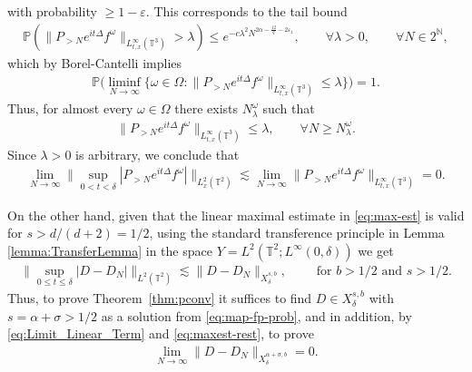 \documentclass[11pt, xcolor = dvipsnames,reqno
]{amsart}
\theoremstyle{definition}
\theoremstyle{remark}
\begin{document}
with probability $\geq 1 - \varepsilon$. 
This corresponds to the tail bound
\begin{align*}
    \mathbb{P}(\|P_{>N} e^{i t \Delta} f^{\omega}\|_{L^{\infty}_{t,x}(\mathbb{T}^3)}  > \lambda) \leq e^{-c \lambda^2 N^{2\alpha - \frac{12}{q} - 2\varepsilon_1}}, 
    \qquad \forall \lambda > 0, \qquad \forall N \in 2^{\mathbb N}, 
\end{align*}
which by Borel-Cantelli implies
\begin{align*}
        \mathbb{P} \Big(\liminf_{N \rightarrow \infty} \big\{ \omega \in \Omega : \|P_{> N} e^{it\Delta}f^{\omega}\|_{L^{\infty}_{t,x}(\mathbb{T}^3)} \leq \lambda \big\} \Big) = 1.
    \end{align*}
    Thus, for almost every $\omega \in \Omega$ there exists $N^{\omega}_{\lambda}$ such that
    \begin{align*}
        \|P_{> N} e^{it\Delta}f^{\omega}\|_{L^{\infty}_{t,x}(\mathbb{T}^3)} \leq \lambda, 
        \qquad \forall N \geq N^{\omega}_{\lambda}.
    \end{align*}
    Since $\lambda > 0$ is arbitrary, we conclude that  
    \begin{align}\label{eq:prob-tail}
        \lim_{N \to \infty} 
        \Big\| \sup_{0 < t < \delta} 
		| P_{> N} e^{it\Delta} f^\omega | \Big\|_{L^2_x(\mathbb{T}^2)} \lesssim 
        \lim_{N \to \infty} \|P_{> N} e^{it\Delta}f^{\omega}\|_{L^{\infty}_{t,x}(\mathbb{T}^3)} = 0. 
    \end{align}

    
    On the other hand, given that the linear maximal estimate in \eqref{eq:max-est} is valid for $s > d/(d+2) = 1/2$, using the standard transference principle in Lemma \ref{lemma:TransferLemma} in the space $Y = L^{2}(\mathbb{T}^2; L^{\infty}(0, \delta))$ we get
	\begin{align}\label{eq:maxest-rest}
		\Big\| \sup_{0 \leq t \leq \delta} | D - D_N | \Big\|_{L^2(\mathbb{T}^2)}  
        \lesssim
		\|  D  - D_N \|_{X^{s,b}_{\delta }},
        \qquad \text{ for } b > 1/2 \text{ and } s > 1/2.
	\end{align}
    Thus, to prove Theorem~\ref{thm:pconv} it suffices to find $D \in X^{s, b}_\delta$ with $s = \alpha + \sigma > 1/2$ as a solution from \eqref{eq:map-fp-prob}, 
    and in addition, by \eqref{eq:Limit_Linear_Term} and \eqref{eq:maxest-rest}, to prove 
    \begin{align}\label{eq:red-pconv-rest}
        \lim_{N \rightarrow \infty} 
        \|  D  - D_N \|_{X^{\alpha + \sigma,b}_{\delta }} 
        = 0.
    \end{align}
\end{document}
